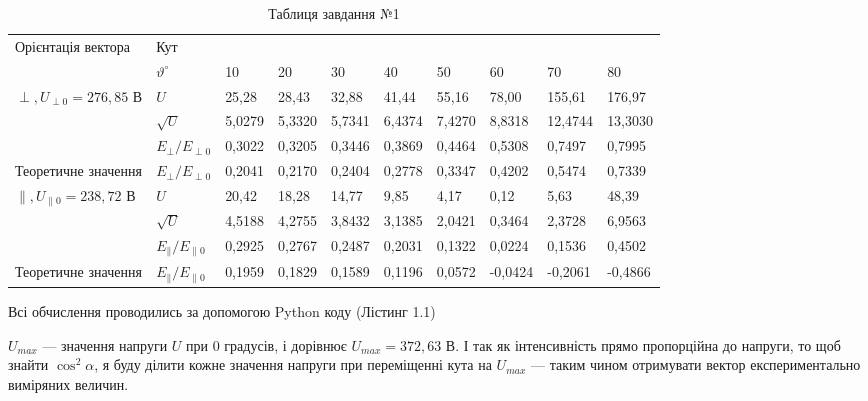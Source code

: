 \documentclass[12pt,a4paper]{article}
\begin{document}
\begin{landscape}
    \begin{table}[ht]
        \centering
        \begin{tabular}{|l|l|l|l|l|l|l|l|l|l|}
        \hline
        \multirow{2}{*}{Орієнтація вектора} & \multicolumn{9}{l|}{Кут}                     \\ \cline{2-10}
                                            & $\vartheta^{\circ}$ & 10 & 20 & 30 & 40 & 50 & 60 & 70 & 80 \\ \hline
        \multirow{3}{*}{$\perp, U_{\perp0} = 276{,}85$ В}               & $U$     & 25,28 &  28,43  &  32,88  &  41,44  &  55,16  &  78,00  &  155,61  &  176,97  \\ \cline{2-10}
                                            & $\sqrt{U}$ &  5,0279  &  5,3320  &  5,7341  &  6,4374  &  7,4270  &  8,8318  &  12,4744  &  13,3030  \\ \cline{2-10}
                                            & $E_{\perp} / E_{\perp0}$   &  0,3022  &  0,3205  &  0,3446  &  0,3869  &  0,4464  & 0,5308  & 0,7497 & 0,7995  \\ \hline
        Теоретичне
        значення                     & $E_{\perp} / E_{\perp0}$   &  0,2041  &  0,2170  &  0,2404  &  0,2778  & 0,3347   &  0,4202  &  0,5474  &  0,7339  \\ \hline
        \multirow{3}{*}{$\parallel, U_{\parallel0} = 238{,}72$ В}        & $U$    &  20,42  &  18,28  &  14,77  &  9,85  &  4,17  &  0,12  &  5,63  & 48,39   \\ \cline{2-10}
                                            & $\sqrt{U}$ &  4,5188  &  4,2755  & 3,8432  &  3,1385  &  2,0421  & 0,3464   &  2,3728  & 6,9563   \\ \cline{2-10}
                                            & $E_{\parallel} / E_{\parallel0}$ & 0,2925   &   0,2767  &   0,2487 &  0,2031  &  0,1322  &  0,0224  &  0,1536  &  0,4502  \\ \hline
        Теоретичне
        значення                     & $E_{\parallel} / E_{\parallel0}$  &  0,1959  &  0,1829  &  0,1589  &  0,1196  &  0,0572  &  -0,0424  &  -0,2061  & -0,4866  \\ \hline
        \end{tabular}
        \caption{Таблиця завдання №1}
    \end{table}

    Всі обчислення проводились за допомогою Python коду (Лістинг 1.1)

    $U_{max}$ --- значення напруги $U$ при 0 градусів, і дорівнює $U_{max} = 372{,}63$ В. І так як інтенсивність прямо пропорційна до напруги, то щоб знайти
    $\cos^2 \alpha$, я буду ділити кожне значення напруги при переміщенні кута на $U_{max}$ --- таким чином отримувати вектор експериментально виміряних величин.

    \end{landscape}
\end{document}
